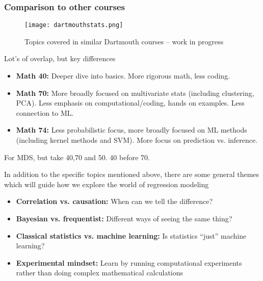 \documentclass[serif,mathserif]{beamer}
\begin{document}
\begin{frame}
\frametitle{Comparison to other courses}


\begin{figure}
        \centering
        \texttt{[image: dartmouthstats.png]}
        \caption{Topics covered in similar Dartmouth courses --  work in progress}
\end{figure}
    
 \pause

    


\end{frame}

\begin{frame}


Lot's of overlap, but key differences 
\begin{itemize}
\item {\bf Math 40:} Deeper dive into basics. More rigorous math, less coding. 
\item {\bf Math 70:} More broadly focused on multivariate stats (including clustering, PCA). Less emphasis on computational/coding, hands on examples. Less connection to ML. 
\item {\bf Math 74:} Less probabilistic focus, more broadly focused on ML methods (including kernel methods and SVM). More focus on prediction vs. inference. 
\end{itemize}

\pause
For MDS, but take 40,70 and 50. 40 before 70. 



\end{frame}


\begin{frame}

In addition to the specific topics mentioned above, there are some general themes which will guide how we explore the world of regression modeling
\begin{itemize}
\item {\bf Correlation vs. causation:} When can we tell the difference? 
\item {\bf Bayesian vs. frequentist:} Different ways of seeing the same thing?  
\item {\bf Classical statistics vs. machine learning:} Is statistics ``just'' machine learning? 
\item {\bf Experimental mindset:}  Learn by running computational experiments rather than doing complex mathematical calculations 
\end{itemize}


\end{frame}
\end{document}
